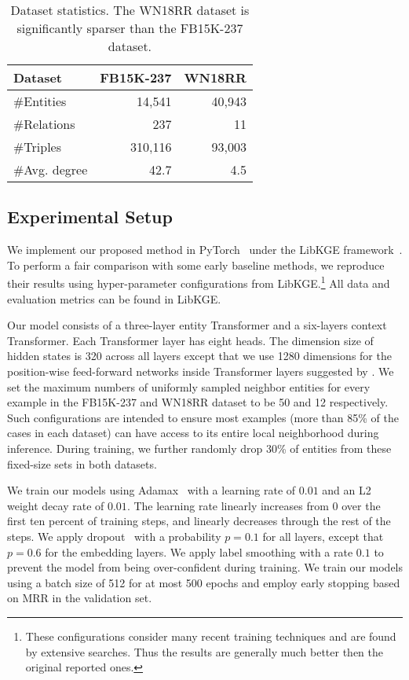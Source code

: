\documentclass[11pt]{article}
\begin{document}
\begin{table}[t]
\centering
\begin{tabular}{lrr}
\toprule
Dataset       & FB15K-237 & WN18RR \\\midrule
\#Entities    & 14,541    & 40,943 \\
\#Relations   & 237       & 11     \\
\#Triples     & 310,116   & 93,003 \\
\#Avg. degree & 42.7      & 4.5   \\\bottomrule
\end{tabular}
\caption{Dataset statistics. The WN18RR dataset is significantly sparser than the FB15K-237 dataset.}
\label{tab:datasets}
\end{table} 

\subsection{Experimental Setup}
\label{sec:exp_setup}
We implement our proposed method in PyTorch~\cite{pytorch} under the LibKGE framework~\cite{broscheit-etal-2020-libkge}.
To perform a fair comparison with some early baseline methods, we reproduce their results using hyper-parameter configurations from LibKGE.\footnote{These configurations consider many recent training techniques and are found by extensive searches. Thus the results are generally much better then the original reported ones.} All data and evaluation metrics can be found in LibKGE.

Our model consists of a three-layer entity Transformer and a six-layers context Transformer. Each Transformer layer has eight heads. The dimension size of hidden states is 320 across all layers except that we use 1280 dimensions for the position-wise feed-forward networks inside Transformer layers suggested by \citet{vaswani2017attention}.
We set the maximum numbers of uniformly sampled neighbor entities for every example in the FB15K-237 and WN18RR dataset to be 50 and 12 respectively.
Such configurations are intended to ensure most examples (more than 85\% of the cases in each dataset) can have access to its entire local neighborhood during inference.
During training, we further randomly drop 30\% of entities from these fixed-size sets in both datasets.

We train our models using Adamax~\cite{kingma2014adam} with a learning rate of $0.01$ and an L2 weight decay rate of $0.01$.
The learning rate linearly increases from $0$ over the first ten percent of training steps, and linearly decreases through the rest of the steps.
We apply dropout~\cite{srivastava2014dropout} with a probability $p=0.1$ for all layers, except that $p=0.6$ for the embedding layers. 
We apply label smoothing with a rate $0.1$ to prevent the model from being over-confident during training.
We train our models using a batch size of 512 for at most 500 epochs and employ early stopping based on MRR in the validation set.
\end{document}
